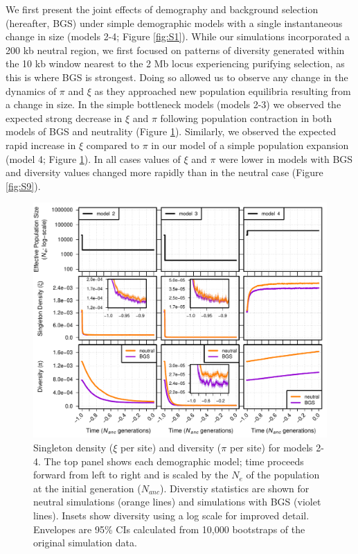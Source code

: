 \documentclass[9pt,twocolumn,twoside]{rilabRxiv}
\begin{document}
We first present the joint effects of demography and background selection (hereafter, BGS) under simple demographic models with a single instantaneous change in size (models 2-4; Figure \ref{fig:S1}).
While our simulations incorporated a 200 kb neutral region, we first focused on patterns of diversity generated within the 10 kb window nearest to the 2 Mb locus experiencing purifying selection, as this is where BGS is strongest.
Doing so allowed us to observe any change in the dynamics of $\pi$ and $\xi$ as they approached new population equilibria resulting from a change in size.
In the simple bottleneck models (models 2-3) we observed the expected strong decrease in $\xi$ and $\pi$ following  population contraction in both models of BGS and neutrality (Figure \ref{fig:S6}).
Similarly, we observed the expected rapid increase in $\xi$ compared to $\pi$ in our model of a simple population expansion (model 4; Figure \ref{fig:S6}).
In all cases values of $\xi$ and $\pi$ were lower in models with BGS and diversity values changed more rapidly than in the neutral case (Figure \ref{fig:S9}).

\begin{figure}[]
\includegraphics[width=\linewidth]{figures/FigS6.pdf}
\caption{Singleton density ($\xi$ per site) and diversity ($\pi$ per site) for models 2-4.
The top panel shows each demographic model; time proceeds forward from left to right and is scaled by the $N_e$ of the population at the initial generation ($N_{anc}$).
Diverstiy statistics are shown for neutral simulations (orange lines) and simulations with BGS (violet lines).
Insets show diversity using a log scale for improved detail.
Envelopes are 95\% CIs calculated from 10,000 bootstraps of the original simulation data.}
\label{fig:S6}
\end{figure}
\end{document}
